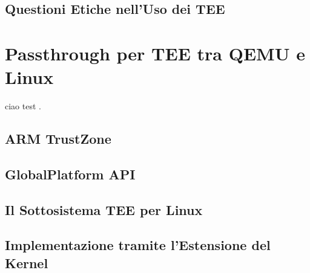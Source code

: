 \documentclass[12pt,italian]{report}
\begin{document}
\section{Questioni Etiche nell'Uso dei TEE}
\label{sec:etica-tee}

\chapter{Passthrough per TEE tra QEMU e Linux}
\label{chap:passthrough-tee-qemu-linux}
ciao test \cite{lim2019web}.

\section{ARM TrustZone}
\label{sec:arm-trustzone}

\section{GlobalPlatform API}
\label{sec:global-platform-api}

\section{Il Sottosistema TEE per Linux}
\label{sec:sottosistema-tee-per-linux}

\section{Implementazione tramite l'Estensione del Kernel}
\label{sec:implementazione-passthrough-tramite-kernel-module}
\end{document}
